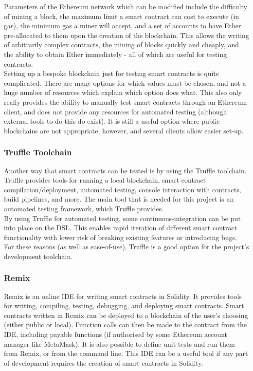 Parameters of the Ethereum network which can be modified include the difficulty of mining a block, the maximum limit a smart contract can cost to execute (in gas), the minimum gas a miner will accept, and a set of accounts to have Ether pre-allocated to them upon the creation of the blockchain. This allows the writing of arbitrarily complex contracts, the mining of blocks quickly and cheaply, and the ability to obtain Ether immediately - all of which are useful for testing contracts\cite{Geth}. \\

Setting up a bespoke blockchain just for testing smart contracts is quite complicated. There are many options for which values must be chosen, and not a huge number of resources which explain which option does what. This also only really provides the ability to manually test smart contracts through an Ethereum client, and does not provide any resources for automated testing (although external tools to do this do exist). It is still a useful option where public blockchains are not appropriate, however, and several clients allow easier set-up.


\subsubsection{Truffle Toolchain}

Another way that smart contracts can be tested is by using the Truffle toolchain. Truffle provides tools for running a local blockchain, smart contract compilation/deployment, automated testing, console interaction with contracts, build pipelines, and more\cite{Truffle}. The main tool that is needed for this project is an automated testing framework, which Truffle provides. \\

By using Truffle for automated testing, some continuous-integration can be put into place on the DSL. This enables rapid iteration of different smart contract functionality with lower risk of breaking existing features or introducing bugs. For these reasons (as well as ease-of-use), Truffle is a good option for the project's development toolchain.


\subsubsection{Remix}

Remix is an online IDE for writing smart contracts in Solidity. It provides tools for writing, compiling, testing, debugging, and deploying smart contracts\cite{REMIX}. Smart contracts written in Remix can be deployed to a blockchain of the user's choosing (either public or local). Function calls can then be made to the contract from the IDE, including payable functions (if authorised by some Ethereum account manager like MetaMask). It is also possible to define unit tests and run them from Remix, or from the command line\cite{RMXTST}. This IDE can be a useful tool if any part of development requires the creation of smart contracts in Solidity.


